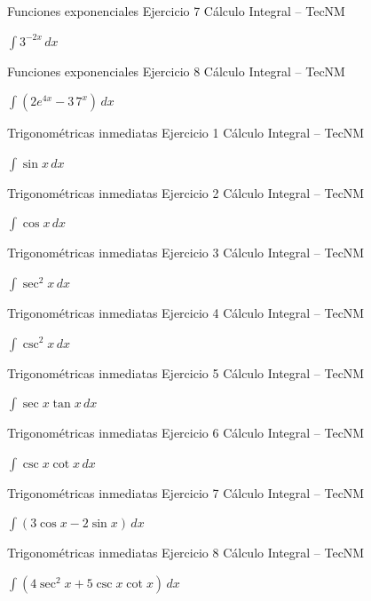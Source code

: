 \documentclass[aspectratio=169,12pt]{beamer}
\newcommand{\ejercicio}[1]{%
  \begin{center}
  \vfill
  {\fontsize{24}{30}\selectfont #1}
  \vfill
  \end{center}
}
\begin{document}
\begin{frame}{Funciones exponenciales}
\small Ejercicio 7 \hfill Cálculo Integral -- TecNM
\ejercicio{$\displaystyle \int 3^{-2x}\,dx$}
\end{frame}

\begin{frame}{Funciones exponenciales}
\small Ejercicio 8 \hfill Cálculo Integral -- TecNM
\ejercicio{$\displaystyle \int(2e^{4x}-3\,7^x)\,dx$}
\end{frame}

\begin{frame}{Trigonométricas inmediatas}
\small Ejercicio 1 \hfill Cálculo Integral -- TecNM
\ejercicio{$\displaystyle \int\sin x\,dx$}
\end{frame}

\begin{frame}{Trigonométricas inmediatas}
\small Ejercicio 2 \hfill Cálculo Integral -- TecNM
\ejercicio{$\displaystyle \int\cos x\,dx$}
\end{frame}

\begin{frame}{Trigonométricas inmediatas}
\small Ejercicio 3 \hfill Cálculo Integral -- TecNM
\ejercicio{$\displaystyle \int\sec^2x\,dx$}
\end{frame}

\begin{frame}{Trigonométricas inmediatas}
\small Ejercicio 4 \hfill Cálculo Integral -- TecNM
\ejercicio{$\displaystyle \int\csc^2x\,dx$}
\end{frame}

\begin{frame}{Trigonométricas inmediatas}
\small Ejercicio 5 \hfill Cálculo Integral -- TecNM
\ejercicio{$\displaystyle \int\sec x\tan x\,dx$}
\end{frame}

\begin{frame}{Trigonométricas inmediatas}
\small Ejercicio 6 \hfill Cálculo Integral -- TecNM
\ejercicio{$\displaystyle \int\csc x\cot x\,dx$}
\end{frame}

\begin{frame}{Trigonométricas inmediatas}
\small Ejercicio 7 \hfill Cálculo Integral -- TecNM
\ejercicio{$\displaystyle \int(3\cos x-2\sin x)\,dx$}
\end{frame}

\begin{frame}{Trigonométricas inmediatas}
\small Ejercicio 8 \hfill Cálculo Integral -- TecNM
\ejercicio{$\displaystyle \int(4\sec^2x+5\csc x\cot x)\,dx$}
\end{frame}
\end{document}
